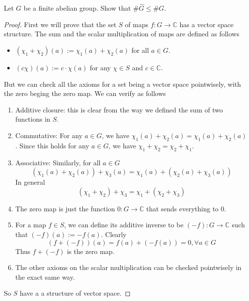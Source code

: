 \documentclass[11pt,letterpaper]{article}
\DeclareMathOperator{\1}{\mathbbm{1}}
\begin{document}
\newpage
\begin{exercise}\label{ex2}
  Let $G$ be a finite abelian group. Show that $\#\hat{G} \le \#G$.
\end{exercise}
\begin{proof}
  First we will prove that the set $S$ of maps $f\colon G \to \mathbb{C}$ has a vector space structure.
  The sum and the scalar multiplication of maps are defined as follows
  \begin{itemize}
    \item $(\chi_1 + \chi_2)(a) := \chi_1(a)+ \chi_2(a)$ for all $a \in G$.
    \item $(c\chi)(a):= c\cdot\chi(a)$ for any $\chi \in S$ and $c \in \mathbb{C}$.
  \end{itemize}
  But we can check all the axioms for a set being a vector space pointwisely, with the zero
  beging the zero map. We can verify as follows
  \begin{enumerate}
    \item Additive closure: this is clear from the way we defined the sum of two functions in $S$.
    \item Commutative: For any $a \in G$, we have $\chi_1(a)+\chi_2(a) = \chi_1(a)+\chi_2(a)$. Since this holds for any $a \in G$, we have $\chi_1 + \chi_2 = \chi_2+\chi_1$.
    \item Associative: Similarly, for all $a \in G$
          \[(\chi_1(a) + \chi_2(a))+\chi_3(a) = \chi_1(a)+ (\chi_2(a)+\chi_3(a))\]
          In general
          \[(\chi_1 + \chi_2)+\chi_3 = \chi_1+ (\chi_2+\chi_3)\]
    \item The zero map is just the function $0 \colon G \to \mathbb{C}$ that sends everything to $0$.
    \item For a map $f \in S$, we can define its additive inverse to be $(-f)\colon G \to \mathbb{C}$ such that $(-f)(a) := -f(a)$. Clearly
          \[(f+ (-f))(a) = f(a) + (-f(a)) = 0, \forall a \in G\]
          Thus $f+(-f)$ is the zero map.
    \item The other axioms on the scalar multiplication can be checked pointwisely in the  exact same way.

  \end{enumerate}

  So $S$ have a a structure of vector space.


\end{proof}
\end{document}
